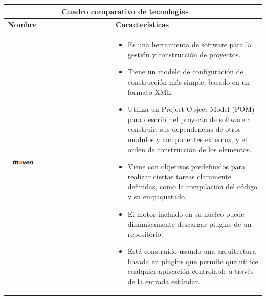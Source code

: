 \begin{table}[b!]
    \centering
    \vspace{-30mm}
      \begin{tabular}{|p{2cm}|ll}
        \hline
        
        \multicolumn{2}{|c|}{{\bf Cuadro comparativo de tecnologías}} \\ 
        \hline
          \multicolumn{1}{|p{4cm}|}{{\bf Nombre}} & 
		  \multicolumn{1}{p{10cm}|}{{\bf Características}}\\

        \hline
          \multicolumn{1}{|p{5cm}|}{\includegraphics[width=0.3\textwidth]{images/maven}} & 
          \multicolumn{2}{p{10cm}|}{\begin{itemize}
          \vspace{-10mm}
        \item Es una herramienta de software para la gestión y construcción de proyectos.
        \item Tiene un modelo de configuración de construcción más simple, basado en un formato XML.
        \item Utiliza un Project Object Model (POM) para describir el proyecto de software a construir, sus dependencias de otros 				módulos y componentes externos, y el orden de construcción de los elementos.
        \item  Viene con objetivos predefinidos para realizar ciertas tareas claramente definidas, como la compilación del código y su 		empaquetado.
        \item El motor incluido en su núcleo puede dinámicamente descargar plugins de un repositorio.
        \item Está construido usando una arquitectura basada en plugins que permite que utilice cualquier aplicación controlable a través de la entrada estándar. 
       \cite{36}
      \end{itemize}} \\
         

\end{tabular}
\end{table}
